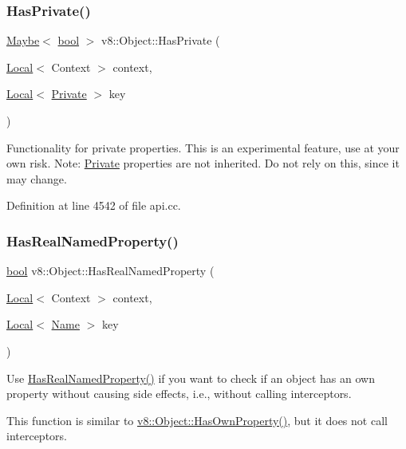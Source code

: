 \subsubsection{\texorpdfstring{Has\+Private()}{HasPrivate()}}
{\footnotesize\ttfamily \mbox{\hyperlink{classv8_1_1Maybe}{Maybe}}$<$ \mbox{\hyperlink{classbool}{bool}} $>$ v8\+::\+Object\+::\+Has\+Private (\begin{DoxyParamCaption}\item[{\mbox{\hyperlink{classv8_1_1Local}{Local}}$<$ Context $>$}]{context,  }\item[{\mbox{\hyperlink{classv8_1_1Local}{Local}}$<$ \mbox{\hyperlink{classv8_1_1Private}{Private}} $>$}]{key }\end{DoxyParamCaption})}

Functionality for private properties. This is an experimental feature, use at your own risk. Note\+: \mbox{\hyperlink{classv8_1_1Private}{Private}} properties are not inherited. Do not rely on this, since it may change. 

Definition at line 4542 of file api.\+cc.

\mbox{\label{classv8_1_1Object_a305a692fa4a571a41755520b6344fa1c}} 
\subsubsection{\texorpdfstring{Has\+Real\+Named\+Property()}{HasRealNamedProperty()}}
{\footnotesize\ttfamily \mbox{\hyperlink{classbool}{bool}} v8\+::\+Object\+::\+Has\+Real\+Named\+Property (\begin{DoxyParamCaption}\item[{\mbox{\hyperlink{classv8_1_1Local}{Local}}$<$ Context $>$}]{context,  }\item[{\mbox{\hyperlink{classv8_1_1Local}{Local}}$<$ \mbox{\hyperlink{classv8_1_1Name}{Name}} $>$}]{key }\end{DoxyParamCaption})}

Use \mbox{\hyperlink{classv8_1_1Object_a305a692fa4a571a41755520b6344fa1c}{Has\+Real\+Named\+Property()}} if you want to check if an object has an own property without causing side effects, i.\+e., without calling interceptors.

This function is similar to \mbox{\hyperlink{classv8_1_1Object_acfe461c8e81a3d078d62ece594cb1994}{v8\+::\+Object\+::\+Has\+Own\+Property()}}, but it does not call interceptors.

